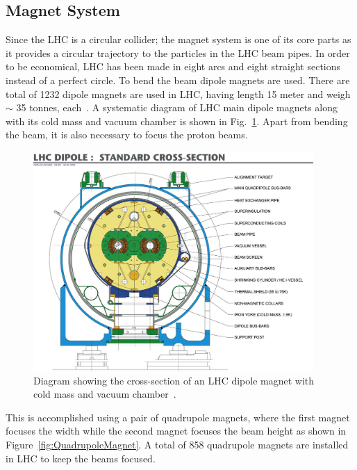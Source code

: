 \subsection{Magnet System}
Since the LHC is a circular collider; the magnet system is one of its core parts as it provides a circular trajectory to the particles in the LHC beam pipes.
In order to be economical, LHC has been made in eight arcs and eight straight sections instead of a perfect circle.
To bend the beam dipole magnets are used. There are total of 1232 dipole magnets are used in LHC, having length 15 meter and weigh $\sim$ 35 tonnes, each~\cite{LHC:magnets_rossi}. A systematic diagram of LHC main dipole magnets along with its cold mass and vacuum chamber is shown in Fig.~\ref{fig:LHC_dipole}. Apart from bending the beam, it is also necessary to focus the proton beams.
\begin{figure}[!htbp]
	\centering
	\includegraphics[width=0.95\textwidth]{figures/LHC/9906025_01.jpg}
	\caption{Diagram showing the cross-section of an LHC dipole magnet with cold mass and vacuum chamber~\cite{fig:40524}.}
	\label{fig:LHC_dipole}
\end{figure}
This is accomplished using a pair of quadrupole magnets, where the first magnet focuses the width while the second magnet focuses the beam height as shown in Figure~\ref{fig:QuadrupoleMagnet}.
A total of 858 quadrupole magnets are installed in LHC to keep the beams focused. 
